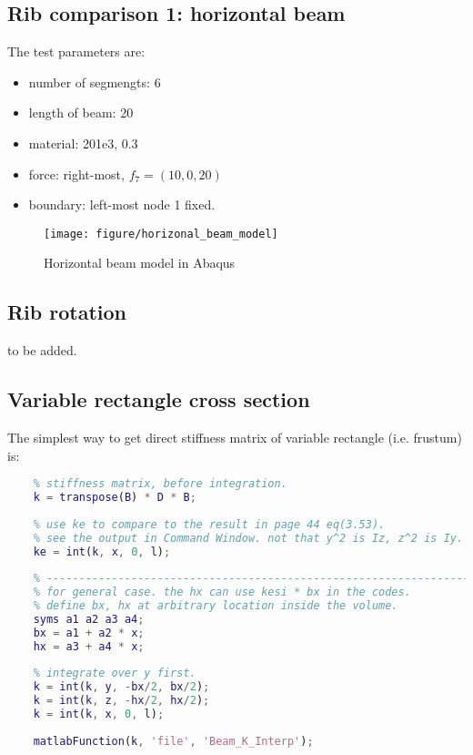 \subsection{Rib comparison 1: horizontal beam}
The test parameters are:
\begin{itemize}
	\item number of segmengts: 6
	\item length of beam: 20
	\item material: 201e3, 0.3
	\item force: right-most, $ f_7 = (10,0,20) $
	\item boundary: left-most node 1 fixed.
\end{itemize}

\begin{figure}[h!]
\centering
\texttt{[image: figure/horizonal\_beam\_model]}
\caption{Horizontal beam model in Abaqus}
\label{fig:horizonalbeammodel}
\end{figure}


\subsection{Rib rotation}
 to be added.
 
 \subsection{Variable rectangle cross section}
 The simplest way to get direct stiffness matrix of variable rectangle (i.e. frustum) is:
 \begin{lstlisting}[language = matlab]
	 % see Code_Beam.m
 	% stiffness matrix, before integration. 
 	k = transpose(B) * D * B;
 	
 	% use ke to compare to the result in page 44 eq(3.53).
 	% see the output in Command Window. not that y^2 is Iz, z^2 is Iy.
 	ke = int(k, x, 0, l);
 	
 	% -------------------------------------------------------------------------
 	% for general case. the hx can use kesi * bx in the codes.
 	% define bx, hx at arbitrary location inside the volume.
 	syms a1 a2 a3 a4;
 	bx = a1 + a2 * x;
 	hx = a3 + a4 * x;
 	
 	% integrate over y first.
 	k = int(k, y, -bx/2, bx/2);
 	k = int(k, z, -hx/2, hx/2);
 	k = int(k, x, 0, l);
 	
 	matlabFunction(k, 'file', 'Beam_K_Interp');
 \end{lstlisting}

